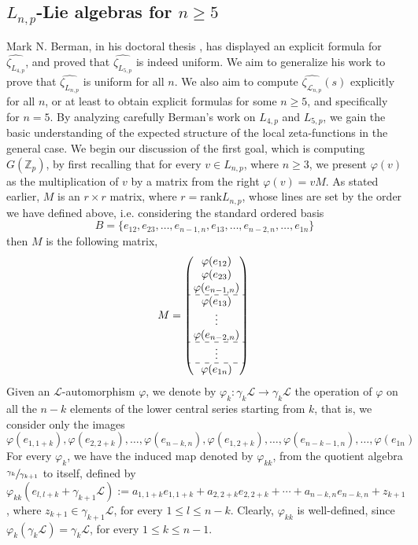 \documentclass[12pt]{article}
\begin{document}
\subsection{$L_{n,p}$-Lie algebras for $n\geq{5}$}
Mark N. Berman, in his doctoral thesis \cite{Berman}, has displayed an explicit formula for $\hat{\zeta_{L_{4,p}}}$, and proved that $\hat{\zeta_{L_{5,p}}}$ is indeed uniform. We aim to generalize his work to prove that $\hat{\zeta_{L_{n,p}}}$ is uniform for all $n$. We also aim to compute $\hat{\zeta_{\mathcal{L}_{n,p}}}(s)$ explicitly for all $n$, or at least to obtain explicit formulas for some $n\geq 5$, and specifically for $n=5$. By analyzing carefully Berman's work on $L_{4,p}$ and $L_{5,p}$, we gain the basic understanding of the expected structure of the local zeta-functions in the general case.
We begin our discussion of the first goal, which is computing $G(\mathbb{Z}_p)$, by first recalling that for every $v\in L_{n,p}$, where $n\geq3$, we present $\varphi(v)$ as the multiplication of $v$ by a matrix from the right $\varphi(v)=vM$. As stated earlier, $M$ is an $r\times r$ matrix, where $r=\mathrm{rank}L_{n,p}$, whose lines are set by the order we have defined above, i.e. considering the standard ordered basis \[B=\{e_{
12},e_{23},\dots,e_{n-1,n},e_{13},\dots,e_{n-2,n},\dots,e_{1n}\}\] then $M$ is the following matrix,
$$
M=\begin{pmatrix}
\varphi(e_{12})\\
\varphi(e_{23})\\
\varphi(e_{n-1,n})\\
\hdashline
\varphi(e_{13})\\
\vdots\\
\varphi(e_{n-2,n})\\
\hdashline
\vdots\\
\hdashline
\varphi(e_{1n})\\
\end{pmatrix}\\
$$
Given an $\mathcal{L}$-automorphism $\varphi$, we denote by $\varphi_k:\gamma_k\mathcal{L}\rightarrow\gamma_k\mathcal{L}$ the operation of $\varphi$ on all the $n-k$ elements of the lower central series starting from $k$, that is, we consider only the images \[\varphi(e_{1,1+k}),\varphi(e_{2,2+k}),\dots,\varphi(e_{n-k,n}),\varphi(e_{1,2+k}),\dots,\varphi(e_{n-k-1,n}),\dots,\varphi(e_{1n})\]
For every $\varphi_k$, we have the induced map denoted by $\varphi_{kk}$, from the quotient algebra $\sfrac{\gamma_k}{\gamma_{k+1}}$ to itself, defined by $\varphi_{kk}(e_{l,l+k}+\gamma_{k+1}\mathcal{L}):=a_{1,1+k}e_{1,1+k}+a_{2,2+k}e_{2,2+k}+\cdots+a_{n-k,n}e_{n-k,n}+z_{k+1}$, where $z_{k+1}\in\gamma_{k+1}\mathcal{L}$, for every $1\leq{l}\leq{n-k}$. Clearly, $\varphi_{kk}$ is well-defined, since $\varphi_k(\gamma_k\mathcal{L})=\gamma_k\mathcal{L}$, for every $1\leq{k}\leq{n-1}$.
\end{document}
